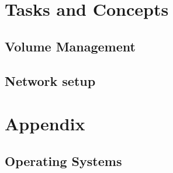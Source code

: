 \documentclass[10pt,a4paper]{book}
\begin{document}
\part{Tasks and Concepts}





\chapter{Volume Management}
  
  









%    







\chapter{Network setup}








\appendix
\part{Appendix}



\chapter{Operating Systems}
\label{SupportedOSes}

    

%
%
\end{document}
